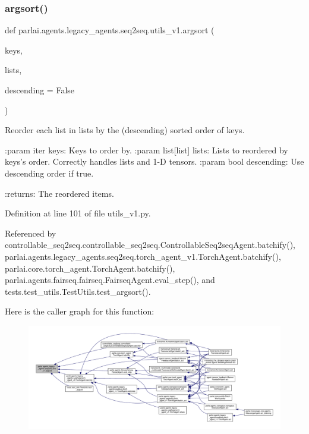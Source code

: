 \subsubsection{\texorpdfstring{argsort()}{argsort()}}
{\footnotesize\ttfamily def parlai.\+agents.\+legacy\+\_\+agents.\+seq2seq.\+utils\+\_\+v1.\+argsort (\begin{DoxyParamCaption}\item[{}]{keys,  }\item[{}]{lists,  }\item[{}]{descending = {\ttfamily False} }\end{DoxyParamCaption})}

\begin{DoxyVerb}Reorder each list in lists by the (descending) sorted order of keys.

:param iter keys: Keys to order by.
:param list[list] lists: Lists to reordered by keys's order.
                         Correctly handles lists and 1-D tensors.
:param bool descending: Use descending order if true.

:returns: The reordered items.
\end{DoxyVerb}
 

Definition at line 101 of file utils\+\_\+v1.\+py.



Referenced by controllable\+\_\+seq2seq.\+controllable\+\_\+seq2seq.\+Controllable\+Seq2seq\+Agent.\+batchify(), parlai.\+agents.\+legacy\+\_\+agents.\+seq2seq.\+torch\+\_\+agent\+\_\+v1.\+Torch\+Agent.\+batchify(), parlai.\+core.\+torch\+\_\+agent.\+Torch\+Agent.\+batchify(), parlai.\+agents.\+fairseq.\+fairseq.\+Fairseq\+Agent.\+eval\+\_\+step(), and tests.\+test\+\_\+utils.\+Test\+Utils.\+test\+\_\+argsort().

Here is the caller graph for this function\+:
\nopagebreak
\begin{figure}[H]
\begin{center}
\leavevmode
\includegraphics[width=350pt]{namespaceparlai_1_1agents_1_1legacy__agents_1_1seq2seq_1_1utils__v1_a1521e559b740f741ebb47b8755202bb2_icgraph}
\end{center}
\end{figure}
\mbox{\label{namespaceparlai_1_1agents_1_1legacy__agents_1_1seq2seq_1_1utils__v1_adb5a414ae439f14c54e8c760b91cc4c8}} 
